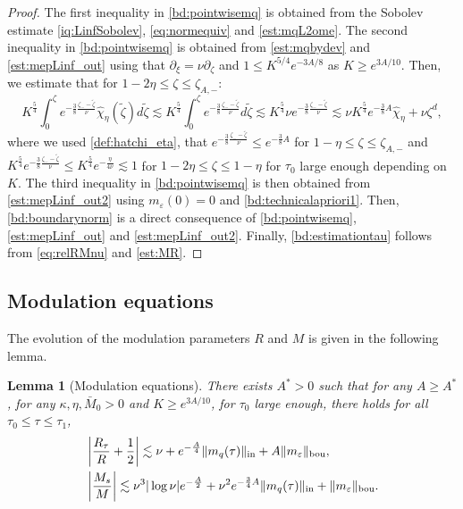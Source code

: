 \documentclass[11pt]{aims}
\newtheorem{lemma}[theorem]{Lemma}
\theoremstyle{definition}
\newcommand{\pa}{\partial}
\newcommand{\inn}{\textup{in}}
\newcommand{\bd}{\textup{bou}}
\newcommand{\be}{\begin{equation}}
\newcommand{\ee}{\end{equation}}
\numberwithin{equation}{section}
\begin{document}
\begin{proof}

The first inequality in \eqref{bd:pointwisemq} is obtained from the Sobolev estimate \eqref{iq:LinfSobolev}, \eqref{eq:normequiv} and \eqref{est:mqL2ome}. The second inequality in \eqref{bd:pointwisemq} is obtained from \eqref{est:mqbydev} and \eqref{est:mepLinf_out} using that $\pa_\xi=\nu \pa_\zeta$ and $1\leq K^{5/4}e^{-3A/8}$ as $K\geq e^{3A/10}$. Then, we estimate that for $1-2\eta\leq \zeta\leq \zeta_{A,-}$:
\be \label{bd:technicalapriori1}
K^{\frac 54}\int_0^\zeta e^{-\frac 38 \frac{\zeta_--\tilde \zeta}{\nu}}\hat \chi_\eta (\tilde \zeta)  d\tilde \zeta \lesssim K^{\frac 54} \int_0^\zeta e^{-\frac 38 \frac{\zeta_--\tilde \zeta}{\nu}}  d\tilde \zeta \lesssim K^{\frac 54} \nu e^{-\frac 38 \frac{\zeta_--\tilde \zeta}{\nu}} \lesssim \nu K^{\frac 54} e^{-\frac 38 A}\hat \chi_\eta+\nu \zeta^d,
\ee
where we used \eqref{def:hatchi_eta}, that $e^{-\frac 38 \frac{\zeta_--\tilde \zeta}{\nu}}\leq e^{-\frac 38 A }$ for $1-\eta \leq \zeta\leq \zeta_{A,-}$ and $K^{\frac 54} e^{-\frac 38 \frac{\zeta_--\tilde \zeta}{\nu}}\leq K^{\frac 54} e^{-\frac{\eta}{4 \nu} }\lesssim 1$ for $1-2\eta \leq \zeta\leq 1 -\eta$ for $\tau_0$ large enough depending on $K$. The third inequality in \eqref{bd:pointwisemq} is then obtained from \eqref{est:mepLinf_out2} using $m_\varepsilon(0)=0$ and \eqref{bd:technicalapriori1}. Then, \eqref{bd:boundarynorm} is a direct consequence of \eqref{bd:pointwisemq}, \eqref{est:mepLinf_out} and \eqref{est:mepLinf_out2}. Finally, \eqref{bd:estimationtau} follows from \eqref{eq:relRMnu} and \eqref{est:MR}. \end{proof}


\subsection{Modulation equations}

The evolution of the modulation parameters $R$ and $M$ is given in the following lemma. 

\begin{lemma}[Modulation equations] \label{lemm:mod}
There exists $A^*>0$ such that for any $A\geq A^*$, for any $\kappa,\eta,\bar M_0>0$ and $K\geq e^{3A/10}$, for $\tau_0$ large enough, there holds for all $\tau_0\leq \tau\leq \tau_1$,
\begin{align}\label{eq:ModR}
& \left| \frac{R_\tau}{ R} + \frac{1}{2} \right|  \lesssim  \nu +  e^{-\frac{A}{4}}\|m_q(\tau)\|_{\inn} +A \| m_\varepsilon \|_{\bd} ,\\
& \label{eq:ModM} \left| \frac{M_s}{M}\right| \lesssim  \nu^3 |\log \nu|e^{-\frac A2}+\nu^2 e^{-\frac 34 A}\|m_q(\tau)\|_{\inn} + \|  m_\varepsilon \|_{\bd}.
\end{align}
\end{lemma}
\end{document}
